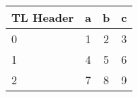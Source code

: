 \begin{table}
\centering
\begin{threeparttable}
\caption{}
\begin{tabular}{lccc}
\toprule
TL Header & a & b & c\\
\midrule
0 & 1 & 2 & 3 \\
1 & 4 & 5 & 6 \\
2 & 7 & 8 & 9 \\
\bottomrule

\end{tabular}
\end{threeparttable}
\end{table}